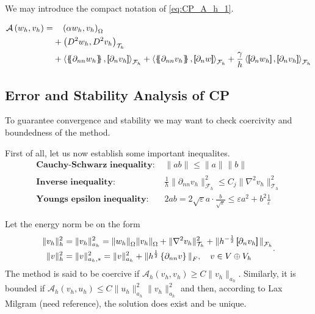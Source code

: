 We may introduce the compact notation of \eqref{eq:CP_A_h_1}.

\begin{equation}
\label{eq:CP_A_h}
\begin{split}
\mathcal{A} \left( w_{h}, v_{h} \right)   =&
  \quad  \left( \alpha  w_{h}, v_{h} \right) _{\Omega }\\
&  +  \left( D^2 w_{h}, D^2v_{h} \right) _{\mathcal{T} _{h}} \\
 & +
  \left< \mean{  \partial _{n n} w_{h} }, \jump{ \partial _{n }v_{h}} \right>_{\mathcal{F}_{h}}  +
 \left< \mean{ \partial _{n n} v_{h} }, \jump{ \partial _{n}w }      \right>_{\mathcal{F}_{h}}
+ \frac{\gamma }{h}  \left< \jump{ \partial _{n} w_{h}}, \jump{ \partial _{n} v_{h}   }   \right>_{\mathcal{F}_{h}}
\end{split}
\end{equation}

\subsection{Error and Stability Analysis of CP}%
\label{sub:error_and_stability_analysis_of_c0ip}

To guarantee convergence and stability we may want to check coercivity and boundedness of the method.

First of all, let us now establish some important inequalites.
\[
\begin{split}
    \textbf{Cauchy-Schwarz inequality: } & \| ab \|_{  }^{  }  \le \| a \|_{  }^{  } \| b \|_{  }^{  }   \\
    \textbf{Inverse inequality: } & \frac{1}{h}\| \partial _{nn}  v_{h} \|_{\mathcal{F}_{h}   }^{2  }  \le C_{j} \| \nabla ^2 v_{h} \|_{ \mathcal{T} _{h} }^{ 2 }   \\
    \textbf{Youngs epsilon inequality: } & 2ab =   2\sqrt{\varepsilon }a\cdot    \frac{b}{\sqrt{\varepsilon } } \le \varepsilon a^2+ b^2 \frac{1}{\varepsilon }
\end{split}
\]

Let the energy norm be on the form
\begin{equation}
\label{eq:A_energy_norm}
    \begin{split}
\| v_{h} \|_{ h }^{2  } & = \| v_{h} \|_{ a_{h} }^{ 2 } =  \|  w_{h} \|_{ \Omega  }^{  }\| v_{h} \|_{ \Omega  }^{  }  +  \| \nabla ^2 v_{h} \|_{ \mathcal{T} _{h}  }^{ 2 }  + \|  h^{-\frac{1}{2}} \left[\!\!\left[  \partial _{n} v_{h}     \right]\!\!\right]\|_{  \mathcal{F} _{h} }^{  } \\
\| v \|_{ h }^{ 2 }  &= \| v \|_{ a_{h},* }^{ 2 } = \| v \|_{ a_{h} }^{ 2 }  + \| h^{\frac{1}{2}} \left\{ \partial _{nn } v\right\}  \|_{ F  }^{  }, \quad  v\in V \oplus V_{h}
    \end{split}
.\end{equation}
The method is said to be coercive if $\mathcal{A} _{h}\left( v_{h}, v_{h} \right) \ge  C \| v_{h} \|_{ a_{h} }^{  } $. Similarly, it is bounded if $ \mathcal{A} _{h} \left( v_{h}, u_{h} \right) \le  C \| u_{h} \|_{  a_{h}}^{ 2 }  \| v_{h} \|_{ a_{h}
}^{ 2 } $ and then, according to Lax Milgram (need reference), the solution does exist and be unique.

